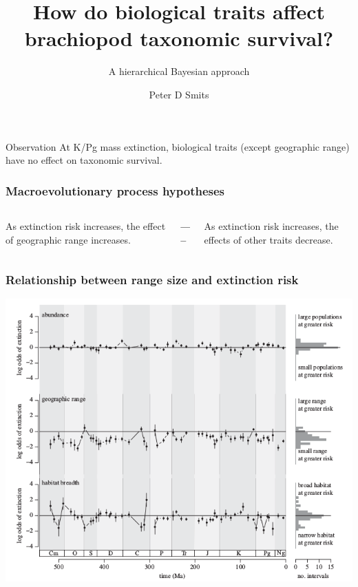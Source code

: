 \documentclass{beamer}
\title{How do biological traits affect brachiopod taxonomic survival?}
\subtitle{A hierarchical Bayesian approach}
\author{Peter D Smits}
\institute{Committee on Evolutionary Biology, University of Chicago}
\date{}
\begin{document}
\begin{frame}
  \maketitle
\end{frame}

\begin{frame}
  \begin{alertblock}{Observation}
    At K/Pg mass extinction, biological traits (except geographic range) have no effect on taxonomic survival.
    
  \end{alertblock}
\end{frame}

\begin{frame}
  \frametitle{Macroevolutionary process hypotheses}
  \begin{center}
    \begin{columns}
      \begin{column}{0.45\textwidth}
        As extinction risk increases, the effect of geographic range increases.
      \end{column}
      \begin{column}{0.05\textwidth}
        \textbf{-----}
      \end{column}
      \begin{column}{0.45\textwidth}
        As extinction risk increases, the effects of other traits decrease.
      \end{column}
    \end{columns}
  \end{center}
\end{frame}

\begin{frame}
  \frametitle{Relationship between range size and extinction risk}
  \begin{center}
    \includegraphics[width = \textwidth,height = 0.8\textheight,keepaspectratio = true]{figure/harnik_rarity}
  \end{center}

\end{frame}
\end{document}
